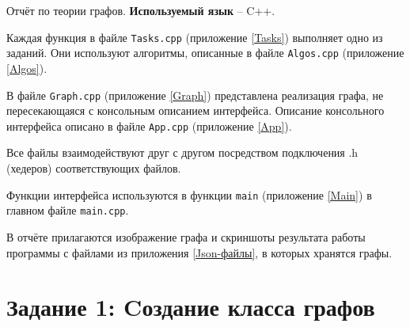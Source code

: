 \documentclass[otchet]{SCWorks}
\begin{document}

\date{2023}

\maketitle


\tableofcontents




\intro

Отчёт по теории графов. \textbf{Используемый язык} -- C++.

Каждая функция в файле \texttt{Tasks.cpp} (приложение \ref{Tasks}) выполняет одно из заданий. Они используют алгоритмы, описанные в файле \texttt{Algos.cpp} (приложение \ref{Algos}).

В файле \texttt{Graph.cpp} (приложение \ref{Graph}) представлена реализация графа, не пересекающаяся с консольным описанием интерфейса. Описание консольного интерфейса описано в файле \texttt{App.cpp} (приложение \ref {App}).

Все файлы взаимодействуют друг с другом посредством подключения .h (хедеров) соответствующих файлов.

Функции интерфейса используются в функции \texttt{main} (приложение \ref{Main}) в главном файле \texttt{main.cpp}.

В отчёте прилагаются изображение графа и скриншоты результата работы программы с файлами из приложения \ref{Json-файлы}, в которых хранятся графы.

\section{Задание 1: Cоздание класса графов}
\end{document}
